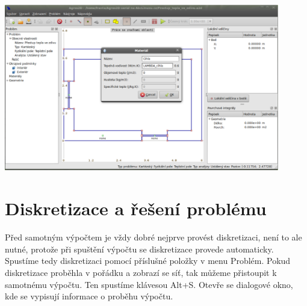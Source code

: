 \documentclass[a4paper, oneside]{article}
\begin{document}
\includegraphics[width=12cm]{Definice_materialu.eps}\\
\section{Diskretizace a řešení problému}
Před samotným výpočtem je vždy dobré nejprve provést diskretizaci, není to ale nutné, protože při spuštění výpočtu se diskretizace provede automaticky. Spustíme tedy diskretizaci pomocí příslušné položky v menu Problém. Pokud diskretizace proběhla v pořádku a zobrazí se síť, tak můžeme přistoupit k samotnému výpočtu. Ten spustíme klávesou Alt+S. Otevře se dialogové okno, kde se vypisují informace o proběhu výpočtu.\\
\end{document}
